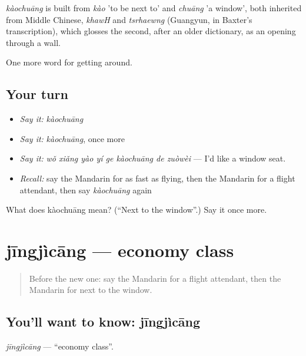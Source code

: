 \begin{cousinweb}
\emph{kàochuāng} is built from \emph{kào} 'to be next to' and \emph{chuāng} 'a window', both inherited from Middle Chinese, \emph{khawH} and \emph{tsrhaewng} (Guangyun, in Baxter's transcription), which glosses the second, after an older dictionary, as an opening through a wall.
\end{cousinweb}

\begin{grammarlens}[title={What you've built}]
One more word for getting around.
\end{grammarlens}

\subsection*{Your turn}
\begin{itemize}
\raggedright
  \item \emph{Say it:} \emph{kàochuāng}
  \item \emph{Say it:} \emph{kàochuāng}, once more
  \item \emph{Say it:} \emph{wǒ xiǎng yào yí ge kàochuāng de zuòwèi} — I'd like a window seat.
  \item \emph{Recall:} say the Mandarin for as fast as flying, then the Mandarin for a flight attendant, then say \emph{kàochuāng} again
\end{itemize}

\begin{tcolorbox}[breakable,colback=teal!4,colframe=teal!35!black,title={Before you move on}]
What does kàochuāng mean? (\textquotedblleft{}Next to the window\textquotedblright{}.) Say it once more.
\end{tcolorbox}
\section[jīngjìcāng]{jīngjìcāng — economy class}

\label{lesson:ZH-C414-jingjicang}



\begin{quote}
Before the new one: say the Mandarin for a flight attendant, then the Mandarin for next to the window.
\end{quote}

\subsection*{You'll want to know: jīngjìcāng}
\emph{jīngjìcāng} — \textquotedblleft{}economy class\textquotedblright{}.

